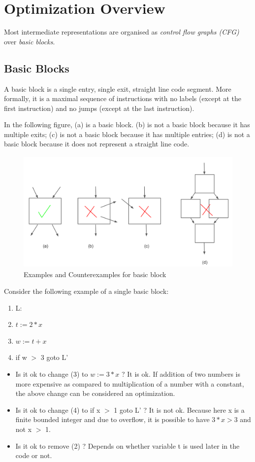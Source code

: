 \section{Optimization Overview}

Most intermediate representations are organised as \textit{control flow graphs (CFG)} over \textit{basic blocks}.

\subsection{Basic Blocks}

A basic block is a single entry, single exit, straight line code segment. More formally, it is a maximal sequence of instructions with no labels (except at the first instruction) and no jumps (except at the last instruction).

In the following figure, (a) is a basic block. (b) is not a basic block because it has multiple exits; (c) is not a basic block because it has multiple entries; (d) is not a basic block because it does not represent a straight line code. 

\begin{figure}[htp]
\centering
\includegraphics[height=6cm]{images/1.png}
\caption{Examples and Counterexamples for basic block}
\end{figure}

Consider the following example of a single basic block:

\begin{enumerate}
    \item L:
    \item \(t := 2 * x\)
    \item \(w := t + x\)
    \item if w \(>\) 3 goto L'
\end{enumerate}

\begin{itemize}
    \item Is it ok to change (3) to \(w := 3 * x\) ?
    It is ok. If addition of two numbers is more expensive as compared to multiplication of a number with a constant, the above change can be considered an optimization.
    \item Is it ok to change (4) to if x \(>\) 1 goto L' ? It is not ok. Because here x is a finite bounded integer and due to overflow, it is possible to have \(3 * x > 3\) and not x \(>\) 1.
    \item Is it ok to remove (2) ? Depends on whether variable t is used later in the code or not.
\end{itemize}

